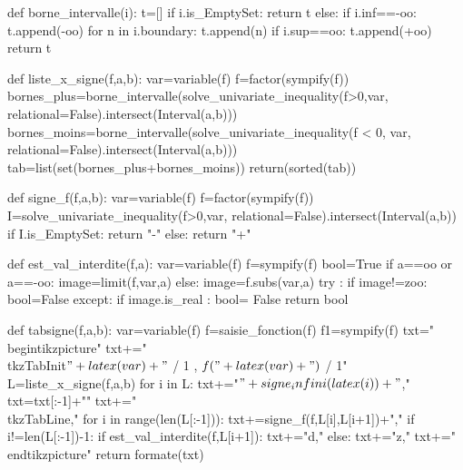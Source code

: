\begin{pycode}
def borne_intervalle(i):
    t=[]
    if i.is_EmptySet:
        return t
    else:
        if i.inf==-oo:
            t.append(-oo)
        for n in i.boundary:
            t.append(n)
        if i.sup==oo:
            t.append(+oo)
        return t

def liste_x_signe(f,a,b):
    var=variable(f)
    f=factor(sympify(f))
    bornes_plus=borne_intervalle(solve_univariate_inequality(f>0,var, relational=False).intersect(Interval(a,b)))
    bornes_moins=borne_intervalle(solve_univariate_inequality(f < 0, var, relational=False).intersect(Interval(a,b)))
    tab=list(set(bornes_plus+bornes_moins))
    return(sorted(tab))


def signe_f(f,a,b):
    var=variable(f)
    f=factor(sympify(f))
    I=solve_univariate_inequality(f>0,var, relational=False).intersect(Interval(a,b))
    if I.is_EmptySet:
        return "-"
    else:
        return "+"


def est_val_interdite(f,a):
    var=variable(f)
    f=sympify(f)
    bool=True
    if a==oo or a==-oo:
        image=limit(f,var,a)
    else:
        image=f.subs(var,a)
    try :
        if image!=zoo:
            bool=False
    except:
        if  image.is_real :
            bool= False
    return bool


def tabsigne(f,a,b):
        var=variable(f)
        f=saisie_fonction(f)
        f1=sympify(f)
        txt="\n \\begin{tikzpicture}"
        txt+="\n \\tkzTabInit{$"+latex(var)+"$ / 1 , $f("+latex(var)+")$ / 1}{"
        L=liste_x_signe(f,a,b)
        for i in L:
            txt+="$"+signe_infini(latex(i))+"$,"
        txt=txt[:-1]+"}"
        txt+="\n \\tkzTabLine{,"
        for i in range(len(L[:-1])):
            txt+=signe_f(f,L[i],L[i+1])+","
            if i!=len(L[:-1])-1:
                if est_val_interdite(f,L[i+1]):
                    txt+="d,"
                else:
                    txt+="z,"
        txt+="}\\end{tikzpicture}"
        return formate(txt)



\end{pycode}